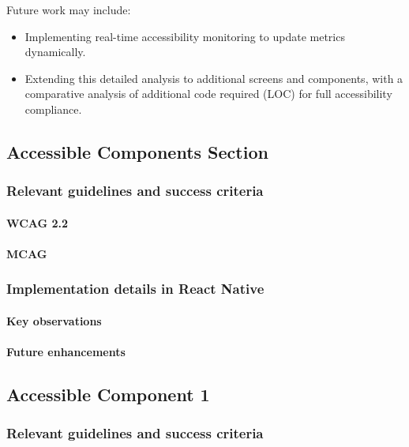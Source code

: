Future work may include:
\begin{itemize}
    \item Implementing real-time accessibility monitoring to update metrics dynamically.
    \item Extending this detailed analysis to additional screens and components, with a comparative analysis of additional code required (LOC) for full accessibility compliance.
\end{itemize}

\subsection{Accessible Components Section}

\subsubsection{Relevant guidelines and success criteria}

\paragraph{WCAG 2.2}

\paragraph{MCAG}

\subsubsection{Implementation details in React Native}

\paragraph{Key observations}

\paragraph{Future enhancements}

\subsection{Accessible Component 1}

\subsubsection{Relevant guidelines and success criteria}

